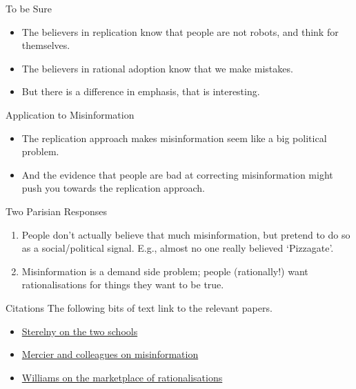 \documentclass[
  17pt,
  letterpaper,
  ignorenonframetext,
  aspectratio=169,
]{beamer}
\providecommand{\tightlist}{%
  \setlength{\itemsep}{0pt}\setlength{\parskip}{0pt}}\usepackage{longtable,booktabs,array}
\begin{document}
\begin{frame}{To be Sure}
\protect\hypertarget{to-be-sure}{}
\begin{itemize}[<+->]
\tightlist
\item
  The believers in replication know that people are not robots, and
  think for themselves.
\item
  The believers in rational adoption know that we make mistakes.
\item
  But there is a difference in emphasis, that is interesting.
\end{itemize}
\end{frame}

\begin{frame}{Application to Misinformation}
\protect\hypertarget{application-to-misinformation}{}
\begin{itemize}[<+->]
\tightlist
\item
  The replication approach makes misinformation seem like a big
  political problem.
\item
  And the evidence that people are bad at correcting misinformation
  might push you towards the replication approach.
\end{itemize}
\end{frame}

\begin{frame}{Two Parisian Responses}
\protect\hypertarget{two-parisian-responses}{}
\begin{enumerate}[<+->]
\tightlist
\item
  People don't actually believe that much misinformation, but pretend to
  do so as a social/political signal. E.g., almost no one really
  believed `Pizzagate'.
\item
  Misinformation is a demand side problem; people (rationally!) want
  rationalisations for things they want to be true.
\end{enumerate}
\end{frame}

\begin{frame}{Citations}
\protect\hypertarget{citations}{}
The following bits of text link to the relevant papers.

\begin{itemize}[<+->]
\tightlist
\item
  \href{https://www.sciencedirect.com/science/article/pii/S1369848616301078\#fn14}{Sterelny
  on the two schools}
\item
  \href{https://www.cambridge.org/core/journals/american-political-science-review/article/analytical-democratic-theory-a-microfoundational-approach/739A9A928A99A47994E4585059B03398}{Mercier
  and colleagues on misinformation}
\item
  \href{https://www.cambridge.org/core/journals/economics-and-philosophy/article/marketplace-of-rationalizations/41FB096344BD344908C7C992D0C0C0DC}{Williams
  on the marketplace of rationalisations}
\end{itemize}
\end{frame}
\end{document}
